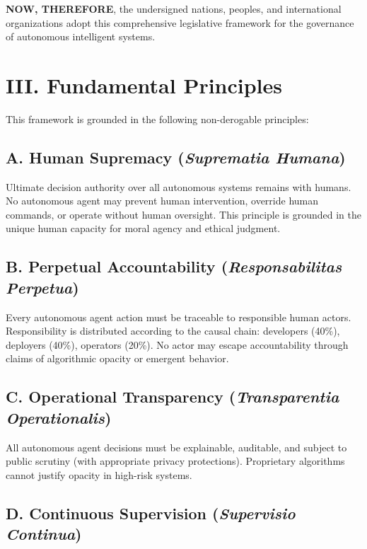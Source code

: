 \textbf{NOW, THEREFORE}, the undersigned nations, peoples, and international organizations adopt this comprehensive legislative framework for the governance of autonomous intelligent systems.

\vspace{0.5cm}

\section*{III. Fundamental Principles}

This framework is grounded in the following non-derogable principles:

\subsection*{A. Human Supremacy (\textit{Suprematia Humana})}

Ultimate decision authority over all autonomous systems remains with humans. No autonomous agent may prevent human intervention, override human commands, or operate without human oversight. This principle is grounded in the unique human capacity for moral agency and ethical judgment.

\subsection*{B. Perpetual Accountability (\textit{Responsabilitas Perpetua})}

Every autonomous agent action must be traceable to responsible human actors. Responsibility is distributed according to the causal chain: developers (40\%), deployers (40\%), operators (20\%). No actor may escape accountability through claims of algorithmic opacity or emergent behavior.

\subsection*{C. Operational Transparency (\textit{Transparentia Operationalis})}

All autonomous agent decisions must be explainable, auditable, and subject to public scrutiny (with appropriate privacy protections). Proprietary algorithms cannot justify opacity in high-risk systems.

\subsection*{D. Continuous Supervision (\textit{Supervisio Continua})}


